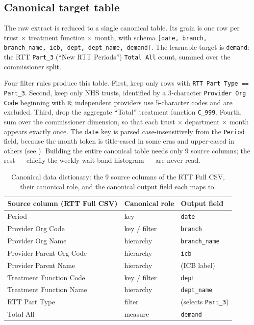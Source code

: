 \documentclass[11pt,a4paper]{article}
\begin{document}
\subsection{Canonical target table}

The raw extract is reduced to a single canonical table. Its grain is one row
per trust $\times$ treatment function $\times$ month, with schema
\texttt{[date, branch, branch\_name, icb, dept, dept\_name, demand]}. The
learnable target is \texttt{demand}: the RTT \texttt{Part\_3} (``New RTT
Periods'') \texttt{Total All} count, summed over the commissioner split.

Four filter rules produce this table. First, keep only rows with
\texttt{RTT Part Type == Part\_3}. Second, keep only NHS trusts, identified by
a 3-character \texttt{Provider Org Code} beginning with \texttt{R}; independent
providers use 5-character codes and are excluded. Third, drop the aggregate
``Total'' treatment function \texttt{C\_999}. Fourth, sum over the commissioner
dimension, so that each trust $\times$ department $\times$ month appears exactly
once. The \texttt{date} key is parsed case-insensitively from the
\texttt{Period} field, because the month token is title-cased in some eras and
upper-cased in others (see ). Building the entire canonical
table needs only 9 source columns; the rest --- chiefly the weekly wait-band
histogram --- are never read.

\begin{table}[H]
\centering
\caption{Canonical data dictionary: the 9 source columns of the RTT Full CSV,
their canonical role, and the canonical output field each maps to.}
\label{tab:dict}
\small
\begin{tabular}{lll}
\toprule
Source column (RTT Full CSV) & Canonical role & Output field \\
\midrule
Period                   & key      & \texttt{date} \\
Provider Org Code        & key / filter & \texttt{branch} \\
Provider Org Name        & hierarchy & \texttt{branch\_name} \\
Provider Parent Org Code & hierarchy & \texttt{icb} \\
Provider Parent Name     & hierarchy & (ICB label) \\
Treatment Function Code  & key / filter & \texttt{dept} \\
Treatment Function Name  & hierarchy & \texttt{dept\_name} \\
RTT Part Type            & filter   & (selects \texttt{Part\_3}) \\
Total All                & measure  & \texttt{demand} \\
\bottomrule
\end{tabular}
\end{table}
\end{document}
